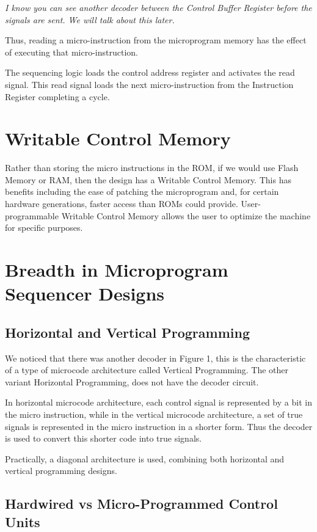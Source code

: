 \textit{I know you can see another decoder between the 
Control Buffer Register before the signals are sent. We will talk about this later.}
    
Thus, reading a micro-instruction from the microprogram 
memory has the effect of executing that micro-instruction.

The sequencing logic loads the control address register and 
activates the read signal. This read signal loads the next micro-instruction from the Instruction Register completing a cycle.

\section{Writable Control Memory}

Rather than storing the micro instructions in the ROM, if we would use Flash Memory or RAM, then the design has a Writable Control Memory. This has benefits including the ease of patching the microprogram and, for certain hardware generations, faster access than ROMs could provide. User-programmable Writable Control Memory allows the user to optimize the machine for specific purposes.

\section{Breadth in Microprogram Sequencer Designs}

\subsection{Horizontal and Vertical Programming}

We noticed that there was another decoder in Figure 1, this is the characteristic of a type of microcode architecture called Vertical Programming. The other variant Horizontal Programming, does not have the decoder circuit.

In horizontal microcode architecture, each control signal is represented by a bit in the micro instruction, while in the vertical microcode architecture, a set of true signals is represented in the micro instruction in a shorter form. Thus the decoder is used to convert this shorter code into true signals.

Practically, a diagonal architecture is used, combining both horizontal and vertical programming designs.

\subsection{Hardwired vs Micro-Programmed Control Units}

